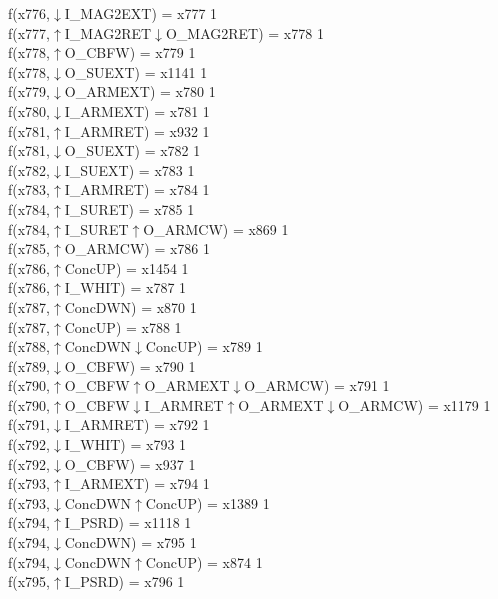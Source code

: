 f(x776,$\downarrow$I\_MAG2EXT) = x777 {1} \\
f(x777,$\uparrow$I\_MAG2RET$\downarrow$O\_MAG2RET) = x778 {1} \\
f(x778,$\uparrow$O\_CBFW) = x779 {1} \\
f(x778,$\downarrow$O\_SUEXT) = x1141 {1} \\
f(x779,$\downarrow$O\_ARMEXT) = x780 {1} \\
f(x780,$\downarrow$I\_ARMEXT) = x781 {1} \\
f(x781,$\uparrow$I\_ARMRET) = x932 {1} \\
f(x781,$\downarrow$O\_SUEXT) = x782 {1} \\
f(x782,$\downarrow$I\_SUEXT) = x783 {1} \\
f(x783,$\uparrow$I\_ARMRET) = x784 {1} \\
f(x784,$\uparrow$I\_SURET) = x785 {1} \\
f(x784,$\uparrow$I\_SURET$\uparrow$O\_ARMCW) = x869 {1} \\
f(x785,$\uparrow$O\_ARMCW) = x786 {1} \\
f(x786,$\uparrow$ConcUP) = x1454 {1} \\
f(x786,$\uparrow$I\_WHIT) = x787 {1} \\
f(x787,$\uparrow$ConcDWN) = x870 {1} \\
f(x787,$\uparrow$ConcUP) = x788 {1} \\
f(x788,$\uparrow$ConcDWN$\downarrow$ConcUP) = x789 {1} \\
f(x789,$\downarrow$O\_CBFW) = x790 {1} \\
f(x790,$\uparrow$O\_CBFW$\uparrow$O\_ARMEXT$\downarrow$O\_ARMCW) = x791 {1} \\
f(x790,$\uparrow$O\_CBFW$\downarrow$I\_ARMRET$\uparrow$O\_ARMEXT$\downarrow$O\_ARMCW) = x1179 {1} \\
f(x791,$\downarrow$I\_ARMRET) = x792 {1} \\
f(x792,$\downarrow$I\_WHIT) = x793 {1} \\
f(x792,$\downarrow$O\_CBFW) = x937 {1} \\
f(x793,$\uparrow$I\_ARMEXT) = x794 {1} \\
f(x793,$\downarrow$ConcDWN$\uparrow$ConcUP) = x1389 {1} \\
f(x794,$\uparrow$I\_PSRD) = x1118 {1} \\
f(x794,$\downarrow$ConcDWN) = x795 {1} \\
f(x794,$\downarrow$ConcDWN$\uparrow$ConcUP) = x874 {1} \\
f(x795,$\uparrow$I\_PSRD) = x796 {1} \\
